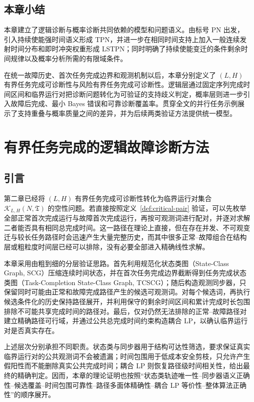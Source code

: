 \documentclass[master,fontset=ubuntu]{shnuthesis}
\theoremstyle{definition}
\begin{document}
\section{本章小结}

本章建立了逻辑诊断与概率诊断共同依赖的模型和问题语义。由标号 PN 出发，引入持续使能强时间语义形成 TPN，并进一步在相同时间支持上加入一般连续发射时间分布和即时冲突权重形成 LSTPN；同时明确了持续使能变迁的条件剩余时间规律以及概率分析所需的有限域条件。

在统一故障历史、首次任务完成边界和观测机制以后，本章分别定义了 \((L,H)\) 有界任务完成可诊断性与风险有界任务完成可诊断性。逻辑层通过固定序列完成时间区间和临界运行对把诊断问题转化为可验证的支持歧义判定，概率层则进一步引入故障后完成、最小 Bayes 错误和可靠诊断覆盖率。贯穿全文的并行任务示例展示了支持重叠与概率质量之间的差异，并为后续两类验证方法提供统一模型。

\chapter{有界任务完成的逻辑故障诊断方法}

\section{引言}

第二章已经将 \((L,H)\) 有界任务完成可诊断性转化为临界运行对集合 \(\mathcal K_{L,H}(N,\mathfrak T)\) 的空性问题。若直接按照定义~\ref{def:critical-pair} 验证，可以先枚举全部正常首次完成运行与故障首次完成运行，再按可观测词进行配对，并逐对求解二者能否具有相同总完成时间。这一路径在理论上直接，但在存在并发、不可观变迁与较长任务路径时会迅速产生大量完整历史，而其中很多正常--故障组合在结构层或粗粒度时间层已经可以排除，没有必要全部进入精确线性求解。

本章采用由粗到细的分层验证思路。首先利用规范化状态类图（State-Class Graph, SCG）压缩连续时间状态，并在首次任务完成边界截断得到任务完成状态类图（Task-Completion State-Class Graph, TCSCG）；随后构造观测同步器，只保留同时可能由正常和故障完成路径产生的候选可观测词。对每个候选词，再执行候选条件化的历史保持路径展开，并利用保守的剩余时间区间和累计完成时长包围排除不可能共享完成时间的路径对。最后，仅对仍然无法排除的正常--故障路径对建立精确路径可行域，并通过公共总完成时间约束构造耦合 LP，以确认临界运行对是否真实存在。

上述层次分别承担不同职责。状态类与同步器用于结构可达性筛选，要求保证真实临界运行对的公共观测词不会被遗漏；时间包围用于低成本安全剪枝，只允许产生假阳性而不能删除真实公共完成时间；耦合 LP 则恢复路径级时间相关性，给出最终的精确判定。因而，本章的理论证明也按照“状态类轨迹唯一性--同步器语义正确性--候选覆盖--时间包围可靠性--路径多面体精确性--耦合 LP 等价性--整体算法正确性”的顺序展开。
\end{document}
